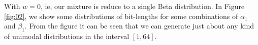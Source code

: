 \documentclass[10pt]{article}
\begin{document}
With $w=0$, ie, our mixture is reduce to a single Beta distribution. In Figure \ref{fig:02},
we show some distributions of bit-lengths for some combinations of $\alpha_1$ and $\beta_1$. From the figure it can be seen that we can generate just about any kind of unimodal distributions in the interval $[1,64]$.
 

\begin{figure}[ht]
  \centering
  \subfigure[$\alpha=1,\beta=32$]{
}
\end{figure}
\end{document}
